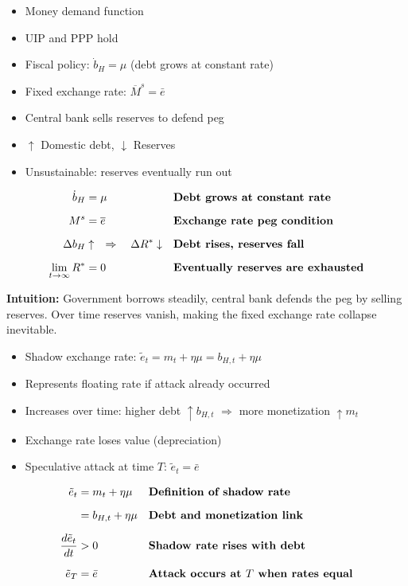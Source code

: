 \documentclass[12pt]{article}
\begin{document}
\begin{itemize}
    \item Money demand function
    \item UIP and PPP hold
    \item Fiscal policy: $\dot{b}_H = \mu$ (debt grows at constant rate)
    \item Fixed exchange rate: $\overline{M}^s = \bar{e}$
    \item Central bank sells reserves to defend peg
    \item $\uparrow$ Domestic debt, $\downarrow$ Reserves
    \item Unsustainable: reserves eventually run out
\end{itemize}

\singlespacing
\begin{align}
\dot{b}_H &= \mu && \text{\textbf{Debt grows at constant rate}} \\[6pt]
M^s &= \overline{e} && \text{\textbf{Exchange rate peg condition}} \\[6pt]
\Delta b_H &\uparrow \quad \Rightarrow \quad \Delta R^* \downarrow && \text{\textbf{Debt rises, reserves fall}} \\[6pt]
\lim_{t \to \infty} R^* &= 0 && \text{\textbf{Eventually reserves are exhausted}}
\end{align}

\textbf{Intuition:} Government borrows steadily, central bank defends the peg by selling reserves. Over time reserves vanish, making the fixed exchange rate collapse inevitable.

\begin{itemize}
    \item Shadow exchange rate: $\tilde{e}_t = m_t + \eta \mu = b_{H,t} + \eta \mu$
    \item Represents floating rate if attack already occurred
    \item Increases over time: higher debt $\uparrow b_{H,t}$ $\Rightarrow$ more monetization $\uparrow m_t$
    \item Exchange rate loses value (depreciation)
    \item Speculative attack at time $T$: $\tilde{e}_t = \bar{e}$
\end{itemize}

\singlespacing
\begin{align}
\tilde{e}_t &= m_t + \eta \mu && \text{\textbf{Definition of shadow rate}} \\[6pt]
            &= b_{H,t} + \eta \mu && \text{\textbf{Debt and monetization link}} \\[6pt]
\frac{d \tilde{e}_t}{dt} &> 0 && \text{\textbf{Shadow rate rises with debt}} \\[6pt]
\tilde{e}_T &= \bar{e} && \text{\textbf{Attack occurs at $T$ when rates equal}}
\end{align}
\end{document}
